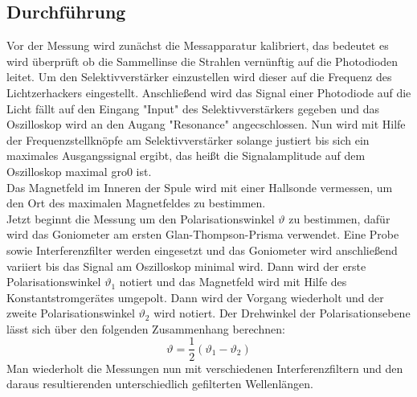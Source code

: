 \subsection{Durchführung}
\label{sec:durch}
Vor der Messung wird zunächst die Messapparatur kalibriert, das bedeutet es wird überprüft ob die Sammellinse die Strahlen vernünftig auf die Photodioden leitet. Um den Selektivverstärker einzustellen wird dieser auf die Frequenz
des Lichtzerhackers eingestellt. Anschließend wird das Signal einer Photodiode auf die Licht fällt auf den Eingang "Input" des Selektivverstärkers gegeben und das Oszilloskop wird an den Augang "Resonance" angecschlossen. Nun wird mit Hilfe der
Frequenzstellknöpfe am Selektivverstärker solange justiert bis sich ein maximales Ausgangssignal ergibt, das heißt die Signalamplitude auf dem Oszilloskop maximal gro0 ist. \\
Das Magnetfeld im Inneren der Spule wird mit einer Hallsonde vermessen, um den Ort des maximalen Magnetfeldes zu bestimmen. \\
Jetzt beginnt die Messung um den Polarisationswinkel $\vartheta$ zu bestimmen, dafür wird das Goniometer am ersten Glan-Thompson-Prisma verwendet.
 Eine Probe sowie Interferenzfilter werden eingesetzt und das Goniometer wird anschließend variiert bis das Signal am Oszilloskop minimal wird.
  Dann wird der erste Polarisationswinkel $\vartheta_\mathrm{1}$ notiert und das Magnetfeld wird mit Hilfe des Konstantstromgerätes umgepolt. Dann wird der Vorgang wiederholt und der zweite
Polarisationswinkel $\vartheta_\mathrm{2}$ wird notiert. Der Drehwinkel der Polarisationsebene lässt sich über den folgenden Zusammenhang berechnen:
\begin{equation}
  \label{eqn:rotawinkel}
  \vartheta=\dfrac{1}{2}(\vartheta_\mathrm{1}-\vartheta_\mathrm{2})
\end{equation}
Man wiederholt die Messungen nun mit verschiedenen Interferenzfiltern und den daraus resultierenden unterschiedlich gefilterten Wellenlängen.
